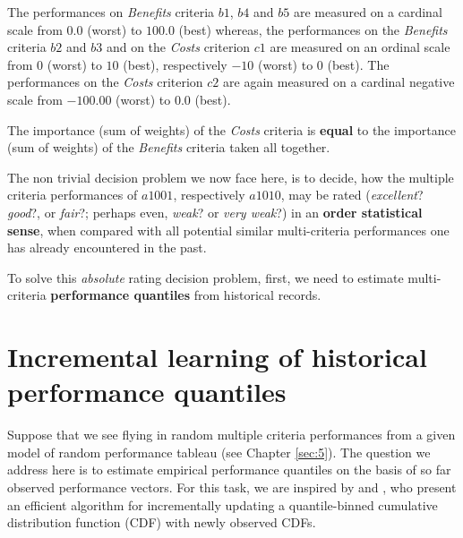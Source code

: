 The performances on \emph{Benefits} criteria $b1$, $b4$ and $b5$ are measured on a cardinal scale from $0.0$ (worst) to $100.0$ (best) whereas, the performances on the \emph{Benefits} criteria $b2$ and $b3$  and on the \emph{Costs} criterion $c1$ are measured on an ordinal scale from $0$ (worst) to $10$ (best), respectively $-10$ (worst) to $0$ (best). The performances on the \emph{Costs} criterion $c2$ are again measured on a cardinal negative scale from $-100.00$ (worst) to $0.0$ (best).

The importance (sum of weights) of the \emph{Costs} criteria is \textbf{equal} to the importance (sum of weights) of the \emph{Benefits} criteria taken all together.
   
The non trivial decision problem we now face here, is to decide, how the multiple criteria performances of $a1001$, respectively $a1010$,  may be rated (\emph{excellent}? \emph{good}?, or \emph{fair}?; perhaps even, \emph{weak}? or \emph{very weak}?) in an \textbf{order statistical sense}, when compared with all potential similar multi-criteria performances one has already encountered in the past. 

To solve this \emph{absolute} rating decision problem, first, we need to estimate multi-criteria \textbf{performance quantiles} from historical records.  

\section{Incremental learning of historical performance quantiles}
\label{sec:10.2}

Suppose that we see flying in random multiple criteria performances from a given model of random performance tableau (see Chapter \ref{sec:5}). The question we address here is to estimate empirical performance quantiles on the basis of so far observed performance vectors. For this task, we are inspired by \citep{CHAM-2006} and \citep{NR3-2007}, who present an efficient algorithm for incrementally updating a quantile-binned cumulative distribution function (CDF) with newly observed CDFs.

